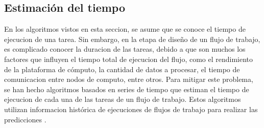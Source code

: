 \subsection{Estimación del tiempo}
En los algoritmos vistos en esta seccion, se asume que se conoce el tiempo de ejecucion de una tarea. Sin embargo, en la etapa de diseño de un flujo de trabajo, es complicado conocer la duracion de las tareas, debido a que son muchos los factores que influyen el tiempo total de ejecucion del flujo, como el rendimiento de la plataforma de cómputo, la cantidad de datos a procesar, el tiempo de comunicacion entre nodos de computo, entre otros. Para mitigar este problema, se han hecho algoritmos basados en series de tiempo que estiman el tiempo de ejecucion de cada una de las tareas de un flujo de trabajo. Estos algoritmos utilizan informacion histórica de ejecuciones de flujos de trabajo para realizar las predicciones  \cite{liu2011novel}.
